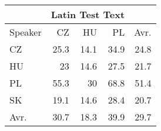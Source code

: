 \begin{tabular}{l|rrr|r}
\hline
 & \multicolumn{3}{c}{Latin Test Text} & \\
\hline
 Speaker   &   CZ &   HU &   PL &   Avr. \\
\hline
 CZ        & 25.3 & 14.1 & 34.9 &   24.8 \\
 HU        & 23   & 14.6 & 27.5 &   21.7 \\
 PL        & 55.3 & 30   & 68.8 &   51.4 \\
 SK        & 19.1 & 14.6 & 28.4 &   20.7 \\
\hline
 Avr.     & 30.7 & 18.3 & 39.9 &   29.7 \\
\hline
\end{tabular}